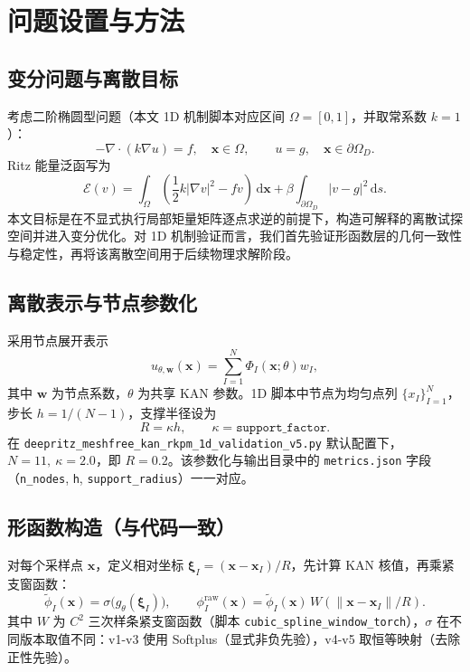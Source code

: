﻿\documentclass[lang=cn,a4paper]{elegantpaper}
\newcommand{\dx}{\,\mathrm{d}\bm{x}}
\newcommand{\ds}{\,\mathrm{d}s}
\begin{document}
\section{问题设置与方法}
\subsection{变分问题与离散目标}
考虑二阶椭圆型问题（本文 1D 机制脚本对应区间 $\Omega=[0,1]$，并取常系数 $k=1$）：
\begin{equation}
  -\nabla\cdot(k\nabla u)=f,\quad \bm{x}\in\Omega,\qquad
  u=g,\quad \bm{x}\in\partial\Omega_D.
\end{equation}
Ritz 能量泛函写为
\begin{equation}
  \mathcal{E}(v)=\int_{\Omega}\left(\frac{1}{2}k|\nabla v|^2-fv\right)\dx
  +\beta\int_{\partial\Omega_D}|v-g|^2\ds.
\end{equation}
本文目标是在不显式执行局部矩量矩阵逐点求逆的前提下，构造可解释的离散试探空间并进入变分优化。对 1D 机制验证而言，我们首先验证形函数层的几何一致性与稳定性，再将该离散空间用于后续物理求解阶段。

\subsection{离散表示与节点参数化}
采用节点展开表示
\begin{equation}
  u_{\theta,\bm{w}}(\bm{x})=\sum_{I=1}^{N}\Phi_I(\bm{x};\theta)w_I,
\end{equation}
其中 $\bm{w}$ 为节点系数，$\theta$ 为共享 KAN 参数。1D 脚本中节点为均匀点列 $\{x_I\}_{I=1}^N$，步长 $h=1/(N-1)$，支撑半径设为
\begin{equation}
  R=\kappa h,\qquad \kappa=\texttt{support\_factor}.
\end{equation}
在 \texttt{deepritz\_meshfree\_kan\_rkpm\_1d\_validation\_v5.py} 默认配置下，$N=11,\ \kappa=2.0$，即 $R=0.2$。该参数化与输出目录中的 \texttt{metrics.json} 字段（\texttt{n\_nodes}, \texttt{h}, \texttt{support\_radius}）一一对应。

\subsection{形函数构造（与代码一致）}
对每个采样点 $\bm{x}$，定义相对坐标 $\bm{\xi}_I=(\bm{x}-\bm{x}_I)/R$，先计算 KAN 核值，再乘紧支窗函数：
\begin{equation}
  \tilde{\phi}_I(\bm{x})=\sigma\!\big(g_\theta(\bm{\xi}_I)\big),\qquad
  \phi_I^{\mathrm{raw}}(\bm{x})=\tilde{\phi}_I(\bm{x})\,W(\|\bm{x}-\bm{x}_I\|/R).
\end{equation}
其中 $W$ 为 $C^2$ 三次样条紧支窗函数（脚本 \texttt{cubic\_spline\_window\_torch}），$\sigma$ 在不同版本取值不同：v1-v3 使用 Softplus（显式非负先验），v4-v5 取恒等映射（去除正性先验）。
\end{document}
